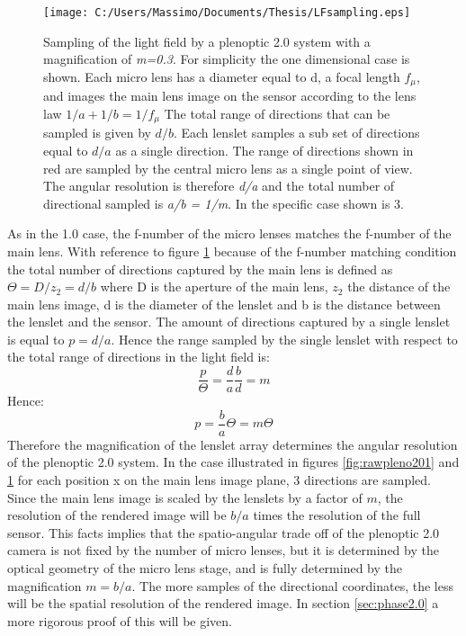   \begin{figure}[H]
  	\centering
  	\texttt{[image: C:/Users/Massimo/Documents/Thesis/LFsampling.eps]}
  	\caption{\label{fig:rawpleno202}Sampling of the light field by a plenoptic 2.0 system with a magnification of \textit{m=0.3}. For simplicity the one dimensional case is shown. Each micro lens has a diameter equal to d, a focal length $f_{\mu}$, and images the main lens image on the sensor according to the lens law $1/a+1/b=1/f_{\mu}$ The total range of directions that can be sampled is given by $d/b$. Each lenslet samples a sub set of directions equal to $d/a$ as a single direction. The range of directions shown in red are sampled by the central micro lens as a single point of view. The angular resolution is therefore \textit{d/a} and the total number of directional sampled is \textit{a/b = 1/m}. In the specific case shown is 3. }
  \end{figure}
  As in the 1.0 case, the f-number of the micro lenses matches the f-number of the main lens.
 With reference to figure \ref{fig:rawpleno202} because of the f-number matching condition the total number of directions captured by the main lens is defined as $\Theta=D/z_2=d/b$ where D is the aperture of the main lens, $z_2$ the distance of the main lens image, d is the diameter of the lenslet and b is the distance between the lenslet and the sensor. The amount of directions captured by a single lenslet is equal to $p=d/a$. Hence the range sampled by the single lenslet with respect to the total range of directions in the light field is:
 \begin{equation}
 \label{eq:magnification}
 \dfrac{p}{\Theta}=\dfrac{d}{a}\dfrac{b}{d}=m
 \end{equation} 
 Hence:
  \begin{equation}
  \label{eq:magnification2}
  p=\dfrac{b}{a}\Theta=m\Theta
  \end{equation}
  Therefore the magnification of the lenslet array determines the angular resolution of the plenoptic 2.0 system. In the case illustrated in figures \ref{fig:rawpleno201} and \ref{fig:rawpleno202} for each position x on the main lens image plane, 3 directions are sampled. Since the main lens image is scaled by the lenslets by a factor of $m$, the resolution of the rendered image will be $b/a$ times the resolution of the full sensor. This facts implies that the spatio-angular trade off of the plenoptic 2.0 camera is not fixed by the number of micro lenses, but it is determined by the optical geometry of the micro lens stage, and is fully determined by the magnification $m=b/a$. The more samples of the directional coordinates, the less will be the spatial resolution of the rendered image. In section \ref{sec:phase2.0} a more rigorous proof of this will be given.
